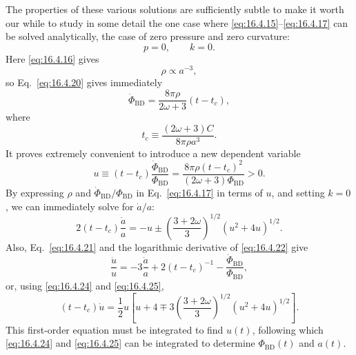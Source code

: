 The properties of these various solutions are sufficiently subtle to make it
worth our while to study in some detail the one case where
\eqref{eq:16.4.15}--\eqref{eq:16.4.17} can be solved analytically, the case
of zero pressure and zero curvature:
\[
  p=0,
  \qquad
  k=0.
\]
Here \eqref{eq:16.4.16} gives
\begin{equation}
  \rho\propto a^{-3},
  \tag{16.4.21}\label{eq:16.4.21}
\end{equation}
so Eq.~\eqref{eq:16.4.20} gives immediately
\begin{equation}
  \dot\Phi_{\mathrm{BD}}
  =
  \frac{8\pi\rho}{2\omega+3}(t-t_c),
  \tag{16.4.22}\label{eq:16.4.22}
\end{equation}
where
\begin{equation}
  t_c
  \equiv
  \frac{(2\omega+3)C}{8\pi\rho a^3}.
  \tag{16.4.23}\label{eq:16.4.23}
\end{equation}
It proves extremely convenient to introduce a new dependent variable
\begin{equation}
  u
  \equiv
  (t-t_c)\frac{\dot\Phi_{\mathrm{BD}}}{\Phi_{\mathrm{BD}}}
  =
  \frac{8\pi\rho(t-t_c)^2}
       {(2\omega+3)\Phi_{\mathrm{BD}}}
  >0.
  \tag{16.4.24}\label{eq:16.4.24}
\end{equation}
By expressing \(\rho\) and
\(\dot\Phi_{\mathrm{BD}}/\Phi_{\mathrm{BD}}\) in
Eq.~\eqref{eq:16.4.17} in terms of \(u\), and setting \(k=0\), we can
immediately solve for \(\dot a/a\):
\begin{equation}
  2(t-t_c)\frac{\dot a}{a}
  =
  -u
  \mathbin{\pm}
  \left(\frac{3+2\omega}{3}\right)^{1/2}
  (u^2+4u)^{1/2}.
  \tag{16.4.25}\label{eq:16.4.25}
\end{equation}
Also, Eq.~\eqref{eq:16.4.21} and the logarithmic derivative of
\eqref{eq:16.4.22} give
\[
  \frac{\dot u}{u}
  =
  -3\frac{\dot a}{a}
  +2(t-t_c)^{-1}
  -\frac{\dot\Phi_{\mathrm{BD}}}{\Phi_{\mathrm{BD}}},
\]
or, using \eqref{eq:16.4.24} and \eqref{eq:16.4.25},
\begin{equation}
  (t-t_c)\dot u
  =
  \frac12u
  \left[
    u+4
    \mathbin{\mp}
    3\left(\frac{3+2\omega}{3}\right)^{1/2}
    (u^2+4u)^{1/2}
  \right].
  \tag{16.4.26}\label{eq:16.4.26}
\end{equation}
This first-order equation must be integrated to find \(u(t)\), following which
\eqref{eq:16.4.24} and \eqref{eq:16.4.25} can be integrated to determine
\(\Phi_{\mathrm{BD}}(t)\) and \(a(t)\).

